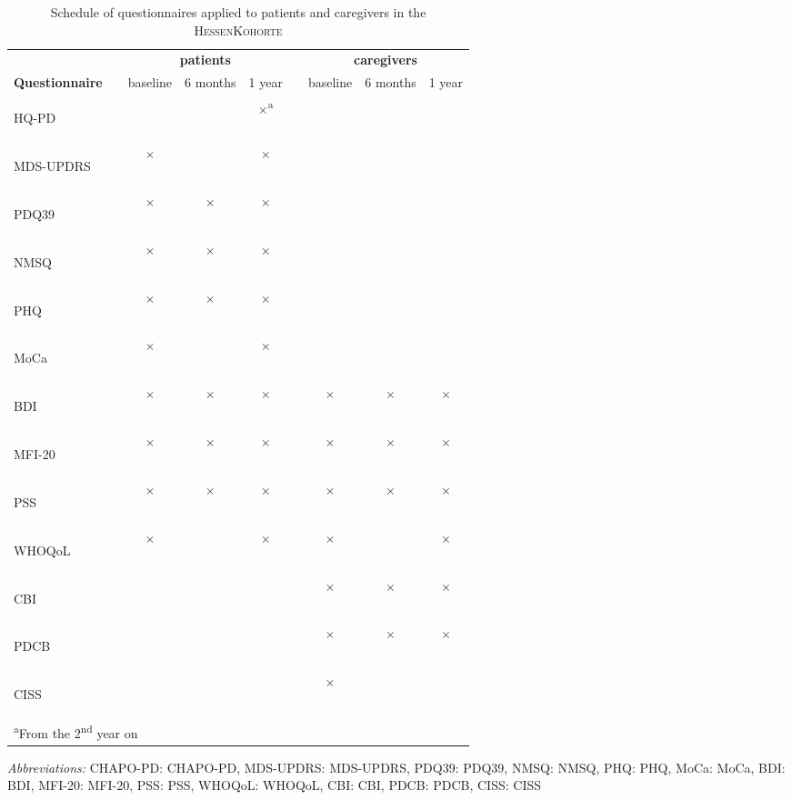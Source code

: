 \newcommand{\FC}{$\times$}
\newcommand{\FCa}{\textsuperscript{\phantom{a}}\FC{}\textsuperscript{a}}
\newcommand{\emC}{}
\newcommand{\acb}[1]{\acs{#1}: \acl{#1}}
\newcommand{\acv}[1]{\begin{NoHyper}\acs{#1}\end{NoHyper}}
\begin{table}[H]
\begin{tabular}{lcccccccc}
\caption{Schedule of questionnaires applied to patients and caregivers in the \textsc{HessenKohorte}}
\label{tab:questionnaireSchedule}\\
\textbf{} & & \multicolumn{3}{c}{\textbf{patients}} & & \multicolumn{3}{c}{\textbf{caregivers}} \\[1em]
\textbf{Questionnaire}& & baseline & 6 months & 1 year  & & baseline   & 6 months & 1 year \\[1em]
\acv{HQ-PD}         & & \emC{}   & \emC{}   & \FCa{}  & & \emC{} & \emC{}   & \emC{} \\
\acv{MDS-UPDRS}       & & \FC{}    & \emC{}   & \FC{}   & & \emC{} & \emC{}   & \emC{} \\
\acv{PDQ39}           & & \FC{}    & \FC{}    & \FC{}   & & \emC{} & \emC{}   & \emC{} \\
\acv{NMSQ}            & & \FC{}    & \FC{}    & \FC{}   & & \emC{} & \emC{}   & \emC{} \\
\acv{PHQ}             & & \FC{}    & \FC{}    & \FC{}   & & \emC{} & \emC{}   & \emC{} \\
\acv{MoCa}            & & \FC{}    & \emC{}   & \FC{}   & & \emC{} & \emC{}   & \emC{} \\
\acv{BDI}             & & \FC{}    & \FC{}    & \FC{}   & & \FC{}  & \FC{}    & \FC{}  \\
\acv{MFI-20}          & & \FC{}    & \FC{}    & \FC{}   & & \FC{}  & \FC{}    & \FC{}  \\
\acv{PSS}             & & \FC{}    & \FC{}    & \FC{}   & & \FC{}  & \FC{}    & \FC{}  \\ 
\acv{WHOQoL}          & & \FC{}    & \emC{}   & \FC{}   & & \FC{}  & \emC{}   & \FC{}  \\
\acv{CBI}             & & \emC{}   & \emC{}   & \emC{}  & & \FC{}  & \FC{}    & \FC{}  \\
\acv{PDCB}            & & \emC{}   & \emC{}   & \emC{}  & & \FC{}  & \FC{}    & \FC{}  \\                              
\acv{CISS}            & & \emC{}   & \emC{}   & \emC{}  & & \FC{}  & \emC{}   & \emC{} \\
\bottomrule
\multicolumn{9}{l}{\footnotesize{\textsuperscript{a}From the 2\textsuperscript{nd} year on}} \\
\end{tabular}

\bigskip
\footnotesize{\textit{Abbreviations:} \acb{CHAPO-PD}, \acb{MDS-UPDRS}, \acb{PDQ39}, \acb{NMSQ}, \acb{PHQ},
\acb{MoCa}, \acb{BDI}, \acb{MFI-20}, \acb{PSS}, \acb{WHOQoL}, \acb{CBI}, \acb{PDCB}, \acb{CISS}}
\end{table}
